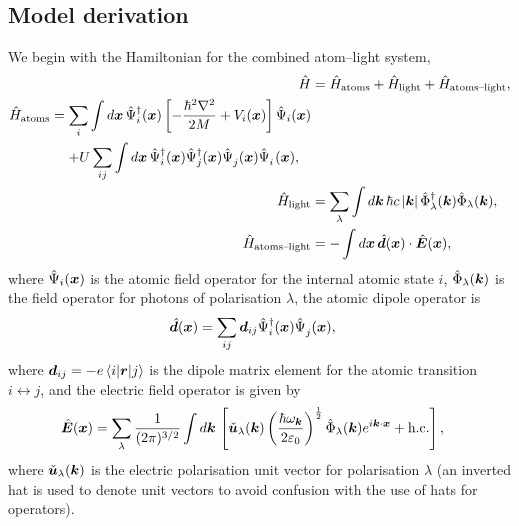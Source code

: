 \subsection{Model derivation}
\label{OpticalPumping:MultimodeModelDerivation}

We begin with the Hamiltonian for the combined atom--light system,
\begin{subequations}
    \label{OpticalPumping:AtomLightHamiltonian}
    \begin{align}
        \hat{H} &= \hat{H}_\text{atoms} + \hat{H}_\text{light} + \hat{H}_\text{atoms--light}, \\
        \begin{split}
            \hat{H}_\text{atoms} &= \sum_i \int d \vect{x}\, \hat{\Psi}_i^\dagger(\vect{x}) \left[ - \frac{\hbar^2 \nabla^2}{2 M} + V_i(\vect{x}) \right] \hat{\Psi}_i(\vect{x}) \\
            &\relphantom{=} + U \sum_{ij}\int d \vect{x}\, \hat{\Psi}_i^\dagger(\vect{x}) \hat{\Psi}_j^\dagger(\vect{x}) \hat{\Psi}_j^{\phantom{\dagger}}(\vect{x}) \hat{\Psi}_i^{\phantom{\dagger}}(\vect{x}),
        \end{split}\\
        \hat{H}_\text{light} &= \sum_\lambda \int d \vect{k}\, \hbar c \abs{\vect{k}} \hat{\Phi}_\lambda^\dagger(\vect{k}) \hat{\Phi}_\lambda(\vect{k}), \\
        \hat{H}_\text{atoms--light} &= - \int d \vect{x}\, \hat{\vect{d}}(\vect{x}) \cdot \hat{\vect{E}}(\vect{x}), \label{OpticalPumping:AtomLightCouplingHamiltonian}
    \end{align}
\end{subequations}
where $\hat{\Psi}_i(\bm{x})$ is the atomic field operator for the internal atomic state $i$, $\hat{\Phi}_\lambda(\bm{k})$ is the field operator for photons of polarisation $\lambda$, the atomic dipole operator is
\begin{align}
    \hat{\bm{d}}(\bm{x}) &= \sum_{ij}\bm{d}_{ij} \hat{\Psi}_i^\dagger(\bm{x}) \hat{\Psi}_j^{\phantom{\dagger}}(\bm{x}),
\end{align}
where $\bm{d}_{ij} = -e\left<i\middle|\bm{r}\middle|j\right>$ is the dipole matrix element for the atomic transition $i \leftrightarrow j$, and the electric field operator is given by
\begin{align}
    \hat{\bm{E}}(\bm{x}) &= \sum_\lambda \frac{1}{(2\pi)^{3/2}} \int d \bm{k}\, \left[\check{\bm{u}}_\lambda(\bm{k}) \left(\frac{\hbar \omega_{\bm{k}}}{2\varepsilon_0} \right)^{\frac{1}{2}} \hat{\Phi}_\lambda(\bm{k}) e^{i \bm{k} \cdot \bm{x}} + \text{h.c.}\right],
\end{align}
where $\check{\bm{u}}_\lambda(\bm{k})$ is the electric polarisation unit vector for polarisation $\lambda$ (an inverted hat is used to denote unit vectors to avoid confusion with the use of hats for operators).

